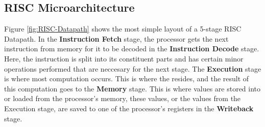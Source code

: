 \subsection{RISC Microarchitecture}
    
    Figure \ref{fig:RISC-Datapath} shows the most simple layout of a 5-stage RISC Datapath. In the \textbf{Instruction Fetch} stage, the processor gets the next instruction from memory for it to be decoded in the \textbf{Instruction Decode} stage. Here, the instruction is split into its constituent parts and has certain minor operations performed that are neccesary for the next stage. The \textbf{Execution} stage is where most computation occurs. This is where the  resides, and the result of this computation goes to the \textbf{Memory} stage. This is where values are stored into or loaded from the processor's memory, these values, or the values from the Execution stage, are saved to one of the processor's registers in the \textbf{Writeback} stage. 
    
